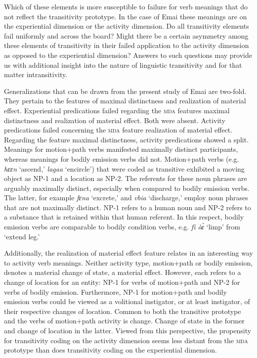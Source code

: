 \documentclass[output=paper,colorlinks,citecolor=brown
]{langscibook}
\begin{document}
Which of these elements is more susceptible to failure for verb meanings that do not reflect the transitivity prototype. In the case of Emai these meanings are on the experiential dimension or the activity dimension. Do all transitivity elements fail uniformly and across the board? Might there be a certain asymmetry among these elements of transitivity in their failed application to the activity dimension as opposed to the experiential dimension? Answers to such questions may provide us with additional insight into the nature of linguistic transitivity and for that matter intransitivity. 

Generalizations that can be drawn from the present study of Emai are two-fold. They pertain to the features of maximal distinctness and realization of material effect. Experiential predications failed regarding the \textsc{mda} features maximal distinctness and realization of material effect. Both were absent. Activity predications failed concerning the \textsc{mda} feature realization of material effect. Regarding the feature maximal distinctness, activity predications showed a split. Meanings for motion+path verbs manifested maximally distinct participants, whereas meanings for bodily emission verbs did not. Motion+path verbs (e.g. \textit{hɛɛn} ‘ascend,’ \textit{lagaa} ‘encircle’) that were coded as transitive exhibited a moving object as NP-1 and a location as NP-2. The referents for these noun phrases are arguably maximally distinct, especially when compared to bodily emission verbs. The latter, for example \textit{fɛna} ‘excrete,’ and \textit{vbia} ‘discharge,’ employ noun phrases that are not maximally distinct. NP-1 refers to a human noun and NP-2 refers to a substance that is retained within that human referent. In this respect, bodily emission verbs are comparable to bodily condition verbs, e.g. \textit{fì òɛ̀} ‘limp’ from ‘extend leg.’  

Additionally, the realization of material effect feature relates in an interesting way to activity verb meanings. Neither activity type, motion+path or bodily emission, denotes a material change of state, a material effect. However, each refers to a change of location for an entity: NP-1 for verbs of motion+path and NP-2 for verbs of bodily emission. Furthermore, NP-1 for motion+path and bodily emission verbs could be viewed as a volitional instigator, or at least instigator, of their respective changes of location. Common to both the transitive prototype and the verbs of motion+path activity is change. Change of state in the former and change of location in the latter. Viewed from this perspective, the propensity for transitivity coding on the activity dimension seems less distant from the \textsc{mda} prototype than does transitivity coding on the experiential dimension. 
\end{document}
